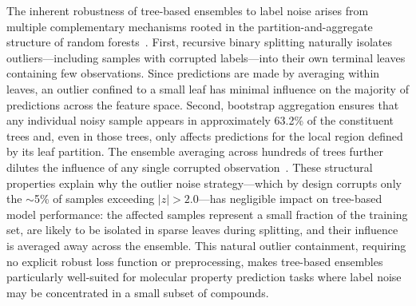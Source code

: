 The inherent robustness of tree-based ensembles to label noise arises from
multiple complementary mechanisms rooted in the partition-and-aggregate
structure of random forests~\citep{breiman2001random}. First, recursive binary
splitting naturally isolates outliers---including samples with corrupted
labels---into their own terminal leaves containing few observations. Since
predictions are made by averaging within leaves, an outlier confined to a
small leaf has minimal influence on the majority of predictions across the
feature space. Second, bootstrap aggregation ensures that any individual noisy
sample appears in approximately 63.2\% of the constituent trees and, even in
those trees, only affects predictions for the local region defined by its leaf
partition. The ensemble averaging across hundreds of trees further dilutes the
influence of any single corrupted observation~\citep{mentch2016quantifying}.
These structural properties explain why the outlier noise strategy---which by
design corrupts only the $\sim$5\% of samples exceeding $|z| > 2.0$---has
negligible impact on tree-based model performance: the affected samples
represent a small fraction of the training set, are likely to be isolated in
sparse leaves during splitting, and their influence is averaged away across the
ensemble. This natural outlier containment, requiring no explicit robust loss
function or preprocessing, makes tree-based ensembles particularly well-suited
for molecular property prediction tasks where label noise may be concentrated in
a small subset of compounds.



